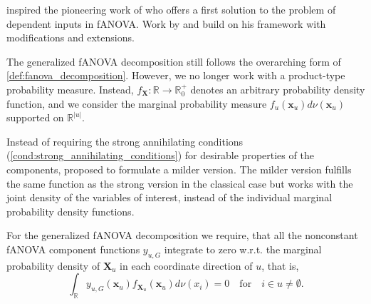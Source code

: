 \citet{stone1994} inspired the pioneering work of \citet{hooker2007} who offers a first solution to the problem of dependent inputs in fANOVA. Work by \cite{chastaing2012} and \cite{rahman2014} build on his framework with modifications and extensions.\par
The generalized fANOVA decomposition still follows the overarching form of \autoref{def:fanova_decomposition}.
However, we no longer work with a product-type probability measure. 
Instead, $f_{\boldsymbol{X}}: \mathbb{R} \rightarrow \mathbb{R}_{0}^{+}$ 
denotes an arbitrary probability density function, and we consider 
the marginal probability measure 
$f_{u}(\boldsymbol{x}_u) d\nu(\boldsymbol{x}_u)$ supported on $\mathbb{R}^{|u|}$.

Instead of requiring the strong annihilating conditions (\autoref{cond:strong_annihilating_conditions}) for desirable properties of the components, \cite{rahman2014} proposed to formulate a milder version.
The milder version fulfills the same function as the strong version in the classical case but works with the joint density of the variables of interest, instead of the individual marginal probability density functions.
\begin{condition}\label{cond:weak_annihilating_conditions}
    For the generalized fANOVA decomposition we require, that all the nonconstant fANOVA component functions $y_{u, G}$ integrate to zero w.r.t. the marginal probability density of $\boldsymbol{X}_u$ in each coordinate direction of $u$, that is,
\begin{equation}
    \int_{\mathbb{R}} y_{u, G}(\boldsymbol{x}_u) f_{\boldsymbol{X}_u}(\boldsymbol{x}_u) d\nu (x_i) = 0 \quad \text{for} \quad i \in u \neq \emptyset.
\end{equation}
\end{condition}


